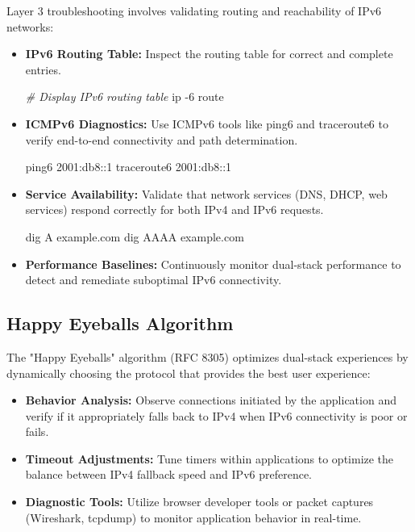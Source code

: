 \documentclass[
]{article}
\newenvironment{Shaded}{}{}
\newcommand{\AttributeTok}[1]{\textcolor[rgb]{0.49,0.56,0.16}{#1}}
\newcommand{\CommentTok}[1]{\textcolor[rgb]{0.38,0.63,0.69}{\textit{#1}}}
\newcommand{\ExtensionTok}[1]{#1}
\newcommand{\NormalTok}[1]{#1}
\providecommand{\tightlist}{%
  \setlength{\itemsep}{0pt}\setlength{\parskip}{0pt}}
\begin{document}
Layer 3 troubleshooting involves validating routing and reachability of
IPv6 networks:

\begin{itemize}
\item
  \textbf{IPv6 Routing Table:} Inspect the routing table for correct and
  complete entries.

\begin{Shaded}
\begin{Highlighting}[]
\CommentTok{\# Display IPv6 routing table}
\ExtensionTok{ip} \AttributeTok{{-}6}\NormalTok{ route}
\end{Highlighting}
\end{Shaded}
\item
  \textbf{ICMPv6 Diagnostics:} Use ICMPv6 tools like ping6 and
  traceroute6 to verify end-to-end connectivity and path determination.

\begin{Shaded}
\begin{Highlighting}[]
\ExtensionTok{ping6}\NormalTok{ 2001:db8::1}
\ExtensionTok{traceroute6}\NormalTok{ 2001:db8::1}
\end{Highlighting}
\end{Shaded}
\item
  \textbf{Service Availability:} Validate that network services (DNS,
  DHCP, web services) respond correctly for both IPv4 and IPv6 requests.

\begin{Shaded}
\begin{Highlighting}[]
\ExtensionTok{dig}\NormalTok{ A example.com}
\ExtensionTok{dig}\NormalTok{ AAAA example.com}
\end{Highlighting}
\end{Shaded}
\item
  \textbf{Performance Baselines:} Continuously monitor dual-stack
  performance to detect and remediate suboptimal IPv6 connectivity.
\end{itemize}

\subsection{Happy Eyeballs Algorithm}\label{happy-eyeballs-algorithm}

The "Happy Eyeballs" algorithm (RFC 8305) optimizes dual-stack
experiences by dynamically choosing the protocol that provides the best
user experience:

\begin{itemize}
\tightlist
\item
  \textbf{Behavior Analysis:} Observe connections initiated by the
  application and verify if it appropriately falls back to IPv4 when
  IPv6 connectivity is poor or fails.
\item
  \textbf{Timeout Adjustments:} Tune timers within applications to
  optimize the balance between IPv4 fallback speed and IPv6 preference.
\item
  \textbf{Diagnostic Tools:} Utilize browser developer tools or packet
  captures (Wireshark, tcpdump) to monitor application behavior in
  real-time.
\end{itemize}
\end{document}

